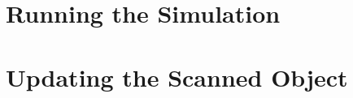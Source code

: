 \documentclass[11pt,oneside,a4paper,final]{article}
\begin{document}
\section{Running the Simulation}

\section{Updating the Scanned Object}



% 
% 
% 
% 
% 
% 
% 
% 
% 
\end{document}
